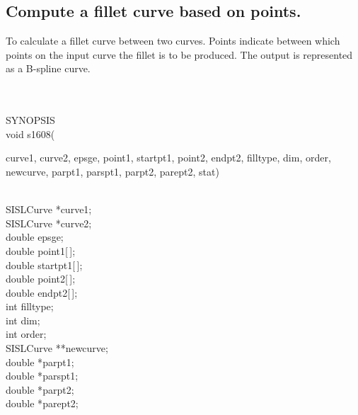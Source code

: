 \subsection{Compute a fillet curve based on points.}
\begin{minipg1}
  To calculate a fillet curve between two curves. Points indicate
  between which points on the input curve the fillet is to be produced.
  The output is represented as a B-spline curve.
\end{minipg1} \\ \\
SYNOPSIS\\
        \>void s1608(\begin{minipg3}
        {\fov curve1}, {\fov curve2}, {\fov epsge}, {\fov point1}, {\fov startpt1}, {\fov point2}, {\fov endpt2},
        {\fov filltype}, {\fov dim}, {\fov order}, {\fov newcurve}, {\fov parpt1}, {\fov parspt1}, {\fov parpt2},
        {\fov parept2}, {\fov stat})
                \end{minipg3}\\[0.3ex]
                \>\>    SISLCurve       \>      *{\fov curve1};\\
                \>\>    SISLCurve       \>      *{\fov curve2};\\
                \>\>    double  \>      {\fov epsge};\\
                \>\>    double  \>      {\fov point1}[\,];\\
                \>\>    double  \>      {\fov startpt1}[\,];\\
                \>\>    double  \>      {\fov point2}[\,];\\
                \>\>    double  \>      {\fov endpt2}[\,];\\
                \>\>    int     \>      {\fov filltype};\\
                \>\>    int     \>      {\fov dim};\\
                \>\>    int     \>      {\fov order};\\
                \>\>    SISLCurve       \>      **{\fov newcurve};\\
                \>\>    double  \>      *{\fov parpt1};\\
                \>\>    double  \>      *{\fov parspt1};\\
                \>\>    double  \>      *{\fov parpt2};\\
                \>\>    double  \>      *{\fov parept2};\\
